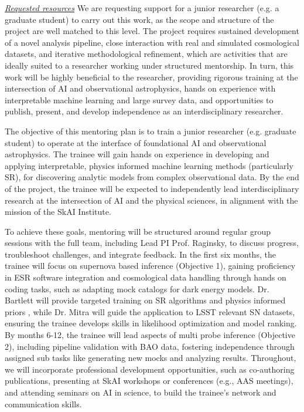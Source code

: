 \documentclass[11pt]{article}
\begin{document}
\underline{\textit{Requested resources}}
We are requesting support for a junior researcher (e.g. a graduate student) to carry out this work, as the scope and structure of the project are well matched to this level. The project requires sustained development of a novel analysis pipeline, close interaction with real and simulated cosmological datasets, and iterative methodological refinement, which are activities that are ideally suited to a researcher working under structured mentorship. In turn, this work will be highly beneficial to the researcher, providing rigorous training at the intersection of AI and observational astrophysics, hands on experience with interpretable machine learning and large survey data, and opportunities to publish, present, and develop independence as an interdisciplinary researcher.


\pagebreak




\clearpage

%

\mentoringplan
The objective of this mentoring plan is to train a junior researcher (e.g. graduate student) to operate at the interface of foundational AI and observational astrophysics. The trainee will gain hands on experience in developing and applying interpretable, physics informed machine learning methods (particularly SR), for discovering analytic models from complex observational data. By the end of the project, the trainee will be expected to independently lead interdisciplinary research at the intersection of AI and the physical sciences, in alignment with the mission of the SkAI Institute.

To achieve these goals, mentoring will be structured around regular group sessions with the full team, including Lead PI Prof. Raginsky, to discuss progress, troubleshoot challenges, and integrate feedback. In the first six months, the trainee will focus on supernova based inference (Objective 1), gaining proficiency in ESR software integration and cosmological data handling through hands on coding tasks, such as adapting mock catalogs \citep{Mitra_2023,Mitra_2025} for dark energy models. Dr. Bartlett will provide targeted training on SR algorithms and physics informed priors \citep{Bartlett_2023}, while Dr. Mitra will guide the application to LSST relevant SN datasets, ensuring the trainee develops skills in likelihood optimization and model ranking. By months 6-12, the trainee will lead aspects of multi probe inference (Objective 2), including pipeline validation with BAO data, fostering independence through assigned sub tasks like generating new mocks and analyzing results. Throughout, we will incorporate professional development opportunities, such as co-authoring publications, presenting at SkAI workshops or conferences (e.g., AAS meetings), and attending  seminars on AI in science, to build the trainee's network and communication skills.
\end{document}
